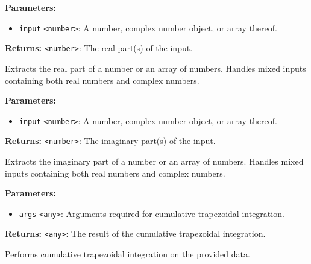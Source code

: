 \documentclass[12pt,a4paper]{article}
\begin{document}
\vspace{5mm}
\noindent {}


\noindent \textbf{Parameters:}
\begin{itemize}
  \item \texttt{input} \texttt{<number>}: A number, complex number object, or array thereof.
\end{itemize}

\noindent \textbf{Returns:} \texttt{<number>}: The real part(s) of the input.

\noindent Extracts the real part of a number or an array of numbers.
Handles mixed inputs containing both real numbers and complex numbers.

\vspace{5mm}
\noindent {}


\noindent \textbf{Parameters:}
\begin{itemize}
  \item \texttt{input} \texttt{<number>}: A number, complex number object, or array thereof.
\end{itemize}

\noindent \textbf{Returns:} \texttt{<number>}: The imaginary part(s) of the input.

\noindent Extracts the imaginary part of a number or an array of numbers.
Handles mixed inputs containing both real numbers and complex numbers.

\vspace{5mm}
\noindent {}


\noindent \textbf{Parameters:}
\begin{itemize}
  \item \texttt{args} \texttt{<any>}: Arguments required for cumulative trapezoidal integration.
\end{itemize}

\noindent \textbf{Returns:} \texttt{<any>}: The result of the cumulative trapezoidal integration.

\noindent Performs cumulative trapezoidal integration on the provided data.
\end{document}
